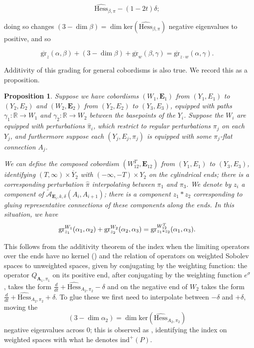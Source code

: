 \documentclass{memo-l}
\newtheorem{proposition}[theorem]{Proposition}
\theoremstyle{definition}
\theoremstyle{remark}
\numberwithin{section}{chapter}
\numberwithin{equation}{chapter}
\begin{document}
$$\widehat{\text{Hess}}_{\beta,\pi} - (1-2t)\delta;$$ 

doing so changes $(3-\dim \beta) = \dim \text{ker}\left(\widehat{\text{Hess}}_{\beta, \pi}\right)$ negative eigenvalues to positive, and so

$$\overline{\text{gr}}_z(\alpha, \beta)  +(3-\dim \beta) + \overline{\text{gr}}_w(\beta, \gamma) = \overline{\text{gr}}_{z \cdot w}(\alpha, \gamma).$$

Additivity of this grading for general cobordisms is also true. We record this as a proposition.

\begin{proposition}\label{gr-add}Suppose we have cobordisms $(W_1, \mathbf{E}_1)$ from $(Y_1, E_1)$ to $(Y_2, E_2)$ and $(W_2, \mathbf{E}_2)$ from $(Y_2, E_2)$ to $(Y_3, E_3)$, equipped with paths $\gamma_1: \mathbb R \to W_1$ and $\gamma_2: \mathbb R \to W_2$ between the basepoints of the $Y_i$. Suppose the $W_i$ are equipped with perturbations $\hat \pi_i$, which restrict to regular perturbations $\pi_j$ on each $Y_j$, and furthermore suppose each $(Y_j, E_j, \pi_j)$ is equipped with some $\pi_j$-flat connection $A_j$. 

We can define the composed cobordism $(W^T_{12}, \mathbf{E}_{12})$ from $(Y_1, E_1)$ to $(Y_3, E_3)$, identifying $(T, \infty) \times \overline Y_2$ with $(-\infty, -T) \times Y_2$ on the cylindrical ends; there is a corresponding perturbation $\hat \pi$ interpolating between $\pi_1$ and $\pi_3$. We denote by $z_i$ a component of $\widetilde{\mathcal A}_{\mathbf{E}_i, k, \delta}(A_i, A_{i+1})$; there is a component $z_1 \ast z_2$ corresponding to gluing representative connections of these components along the ends. In this situation, we have $$\textup{gr}^{W_1}_{z_1}(\alpha_1, \alpha_2) + \textup{gr}^{W_2}_{z_2}(\alpha_2, \alpha_3) = \textup{gr}^{W^T_{12}}_{z_1\ast z_2}(\alpha_1, \alpha_3).$$ 
\end{proposition}

This follows from the additivity theorem of the index when the limiting operators over the ends have no kernel (\cite[Proposition~3.9]{Don}) and the relation of operators on weighted Sobolev spaces to unweighted spaces, given by conjugating by the weighting function: the operator $Q_{\mathbf{A}_1, \pi_1}$ on its positive end, after conjugating by the weighting function $e^\sigma$, takes the form $\frac{d}{dt} + \widehat{\text{Hess}}_{A_2,\pi_2} - \delta$ and on the negative end of $W_2$ takes the form $\frac{d}{dt} + \widehat{\text{Hess}}_{A_2, \pi_2} + \delta$. To glue these we first need to interpolate between $-\delta$ and $+\delta$, moving the 
$$(3-\dim \alpha_2) = \dim \text{ker}\left(\widehat{\text{Hess}}_{A_2,\pi_2}\right)$$ 
negative eigenvalues across $0$; this is observed as \cite[Proposition~3.10]{Don}, identifying the index on weighted spaces with what he denotes $\text{ind}^+(P)$.
\end{document}
